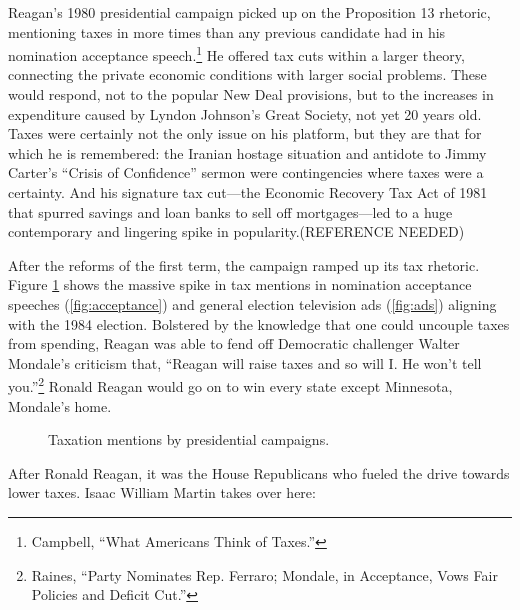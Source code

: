 \documentclass[
]{article}
\begin{document}
Reagan's 1980 presidential campaign picked up on the Proposition 13 rhetoric, mentioning taxes in more times than any previous candidate had in his nomination acceptance speech.\footnote{Campbell, ``What Americans Think of Taxes.''}
He offered tax cuts within a larger theory, connecting the private economic conditions with larger social problems.
These would respond, not to the popular New Deal provisions, but to the increases in expenditure caused by Lyndon Johnson's Great Society, not yet 20 years old.
Taxes were certainly not the only issue on his platform, but they are that for which he is remembered: the Iranian hostage situation and antidote to Jimmy Carter's ``Crisis of Confidence'' sermon were contingencies where taxes were a certainty.
And his signature tax cut---the Economic Recovery Tax Act of 1981 that spurred savings and loan banks to sell off mortgages---led to a huge contemporary and lingering spike in popularity.(REFERENCE NEEDED)

After the reforms of the first term, the campaign ramped up its tax rhetoric.
Figure \ref{fig:taxation} shows the massive spike in tax mentions in nomination acceptance speeches (\ref{fig:acceptance}) and general election television ads (\ref{fig:ads}) aligning with the 1984 election.
Bolstered by the knowledge that one could uncouple taxes from spending, Reagan was able to fend off Democratic challenger Walter Mondale's criticism that, ``Reagan will raise taxes and so will I. He won't tell you.''\footnote{Raines, ``Party Nominates Rep. Ferraro; Mondale, in Acceptance, Vows Fair Policies and Deficit Cut.''}
Ronald Reagan would go on to win every state except Minnesota, Mondale's home.

\begin{figure}

{\centering {}

}

\caption{Taxation mentions by presidential campaigns.}\label{fig:taxation}
\end{figure}

After Ronald Reagan, it was the House Republicans who fueled the drive towards lower taxes.
Isaac William Martin takes over here:
\end{document}
